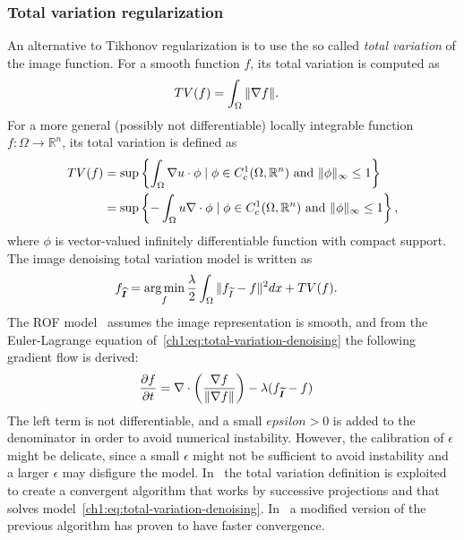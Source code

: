 \subsubsection{Total variation regularization}
An alternative to Tikhonov regularization is to use the so called \emph{total variation} of the image function. For a smooth function $f$, its total variation is computed as
\begin{align*}
	TV(f) &= \int_{\Omega}{ \lVert \nabla f \rVert }.
\end{align*}
%
For a more general (possibly not differentiable) locally integrable function $f:\Omega \rightarrow \mathbb{R}^n$, its total variation is defined as
\begin{align*}
	TV(f) &= \sup \left\{ \int_{\Omega}{\nabla u \cdot \phi} \; | \; \phi \in C_c^{1}(\Omega, \mathbb{R}^n) \text{ and } \lVert\phi\rVert_{\infty} \leq 1 \right\} \\
		  &= \sup \left\{ - \int_{\Omega}{u \nabla \cdot \phi} \; | \; \phi \in C_c^{1}(\Omega, \mathbb{R}^n) \text{ and } \lVert\phi\rVert_{\infty} \leq 1 \right\},	
\end{align*}
%
where $\phi$ is vector-valued infinitely differentiable function with compact support. The image denoising total variation model is written as
\begin{align}
	f_{\bm{\widehat{I}}} &= \operatorname*{arg\,min}_{f} \frac{\lambda}{2} \int_{\Omega}{ \lVert f_{\widetilde{I}} - f\rVert^2dx} + TV(f).
	\label{ch1:eq:total-variation-denoising}
\end{align}
%
The ROF model~\cite{rudin92} assumes the image representation is smooth, and from the Euler-Lagrange equation of~\cref{ch1:eq:total-variation-denoising} the following gradient flow is derived:
\begin{align*}
	\frac{\partial f}{\partial t} &= \nabla \cdot \left( \frac{\nabla f}{\lVert \nabla f\rVert } \right) - \lambda (f_{\widetilde{\bm{I}}} - f)
\end{align*}
%
The left term is not differentiable, and a small $epsilon >0$ is added to the denominator in order to avoid numerical instability. However, the calibration of $\epsilon$ might be delicate, since a small $\epsilon$ might not be sufficient to avoid instability and a larger $\epsilon$ may disfigure the model. In~\cite{chambolle04} the total variation definition is exploited to create a convergent algorithm that works by successive projections and that solves model~\cref{ch1:eq:total-variation-denoising}. In~\cite{beck09a} a modified version of the previous algorithm has proven to have faster convergence. 

